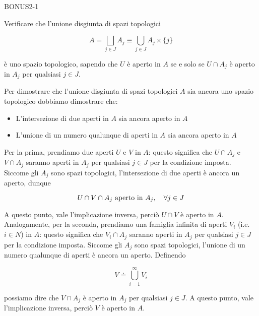 {BONUS2-1}
{
Verificare che l'unione disgiunta di spazi topologici

\begin{equation}
	A = \bigsqcup_{j \in J} A_{j} \equiv \bigcup_{j \in J} A_{j} \times \{j\}
\end{equation}

è uno spazio topologico, sapendo che $ U $ è aperto in $ A $ se e solo se $ U \cap A_{j} $ è aperto in $ A_{j} $ per qualsiasi $ j \in J $.
}
{
Per dimostrare che l'unione disgiunta di spazi topologici $ A $ sia ancora uno spazio topologico dobbiamo dimostrare che:

\begin{itemize}
	\item L'intersezione di due aperti in $ A $ sia ancora aperto in $ A $
	
	\item L'unione di un numero qualunque di aperti in $ A $ sia ancora aperto in $ A $
\end{itemize}

Per la prima, prendiamo due aperti $ U $ e $ V $ in $ A $: questo significa che $ U \cap A_{j} $ e $ V \cap A_{j} $ saranno aperti in $ A_{j} $ per qualsiasi $ j \in J $ per la condizione imposta. Siccome gli $ A_{j} $ sono spazi topologici, l'intersezione di due aperti è ancora un aperto, dunque

\begin{equation}
	U \cap V \cap A_{j} \text{ aperto in } A_{j} \qcomma \forall j \in J
\end{equation}

A questo punto, vale l'implicazione inversa, perciò $ U \cap V $ è aperto in $ A $. \\
Analogamente, per la seconda, prendiamo una famiglia infinita di aperti $ V_{i} $ (i.e. $ i \in N $) in $ A $: questo significa che $ V_{i} \cap A_{j} $ saranno aperti in $ A_{j} $ per qualsiasi $ j \in J $ per la condizione imposta. Siccome gli $ A_{j} $ sono spazi topologici, l'unione di un numero qualunque di aperti è ancora un aperto. Definendo

\begin{equation}
	V \doteq \bigcup_{i=1}^{\infty} V_{i}
\end{equation}

possiamo dire che $ V \cap A_{j} $ è aperto in $ A_{j} $ per qualsiasi $ j \in J $. A questo punto, vale l'implicazione inversa, perciò $ V $ è aperto in $ A $.
}

